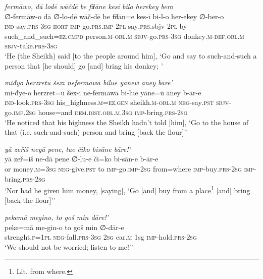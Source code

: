 \ea \label{HB.11}
\textit{fermāwo, dā lodē wāčdē be fiɫāne kesī bilo herekey bero} \\ 
\gll ∅-fermāw-o dā ∅-lo-dē wāč-dē be fiɫān=e kes-ī bi-l-o her-ekey ∅-ber-o \\ 
 \textsc{ind-}say\textsc{.prs}\textsc{-3sg} \textsc{hort} \textsc{imp-}go\textsc{.prs}\textsc{.imp}\textsc{-2pl} say\textsc{.prs}.sbjv\textsc{-2pl} by such\_and\_such\textsc{=ez}\textsc{.cmpd} person\textsc{.m}\textsc{-obl}\textsc{.m} \textsc{sbjv-}go\textsc{.prs}\textsc{-3sg} donkey\textsc{.m}\textsc{-def}\textsc{.obl}\textsc{.m} \textsc{sbjv-}take\textsc{.prs}\textsc{-3sg} \\ 
\glt `He (the Sheikh) said [to the people around him], ‘Go and say to such-and-such a person that [he should] go [and] bring his donkey; '
\z 
 
\ea \label{HB.17}
\textit{miđyo herzretū šēxī nefermāwā bilue yānew āney bāre’} \\ 
\gll mi-đye-o herzret=ū šēx-ī ne-fermāwā bi-lue yāne=ū āney b-ār-e \\ 
 \textsc{ind-}look\textsc{.prs}\textsc{-3sg} his\_highness\textsc{.m}\textsc{=ez}\textsc{.gen} sheikh\textsc{.m}\textsc{-obl}\textsc{.m} \textsc{neg-}say\textsc{.pst} \textsc{sbjv-}go\textsc{.imp}\textsc{.\textsc{2sg}} house=and \textsc{dem.dist}\textsc{.obl}\textsc{.m}\textsc{.3sg} \textsc{imp-}bring\textsc{.prs}-\textsc{2sg} \\ 
\glt `He noticed that his highness the Sheikh hadn’t told [him], ‘Go to the house of that (i.e. such-and-such) person and bring [back the flour]’'
\z 
 
\ea \label{HB.18}
\textit{yā zeřiš neyā pene, lue čiko bisāne bāre!’} \\ 
\gll yā zeř=iš ne-dā pene ∅-lu-e či=ko bi-sān-e b-ār-e \\ 
 or money\textsc{.m}\textsc{=3sg} \textsc{neg-}give\textsc{.pst} to \textsc{imp-}go.\textsc{imp-}\textsc{2sg} from=where \textsc{imp-}buy\textsc{.prs}-\textsc{2sg} \textsc{imp-}bring\textsc{.prs}-\textsc{2sg} \\ 
\glt `Nor had he given him money, [saying], ‘Go [and] buy from a place\footnote{Lit. from where.} [and] bring [back the flour]’'
\z 
 
\ea \label{HB.43}
\textit{pekemā megino, to goš min dāre!’} \\ 
\gll peke=mā me-gin-o to goš min ∅-dār-e \\ 
 strenght\textsc{\textsc{.f}}\textsc{=1pl} \textsc{neg-}fall\textsc{.prs}\textsc{-3sg} \textsc{2sg} ear\textsc{.m} 1sg \textsc{imp-}hold\textsc{.prs}-\textsc{2sg} \\ 
\glt `We should not be worried; listen to me!’'
\z 
 
